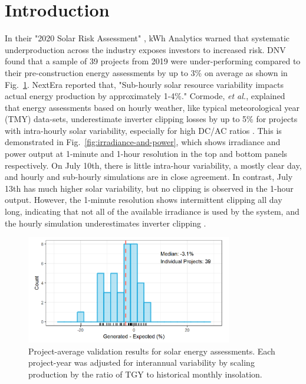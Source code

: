 \documentclass[conference]{IEEEtran}
\begin{document}
\section{Introduction}
In their "2020 Solar Risk Assessment" \cite{Matsui2020}, kWh Analytics warned that systematic underproduction across the industry exposes investors to increased risk. DNV found that a sample of 39 projects from 2019 were under-performing compared to their pre-construction energy assessments by up to 3\% on average as shown in Fig.~\ref{fig:project-underperformance}. NextEra reported that, "Sub-hourly solar resource variability impacts actual energy production by approximately 1-4\%." Cormode, \textit{et al.}, explained that energy assessments based on hourly weather, like typical meteorological year (TMY) data-sets, underestimate inverter clipping losses by up to 5\% for projects with intra-hourly solar variability, especially for high DC/AC ratios \cite{Cormode2019}. This is demonstrated in Fig.~\ref{fig:irradiance-and-power}, which shows irradiance and power output at 1-minute and 1-hour resolution in the top and bottom panels respectively. On July 10th, there is little intra-hour variability, a mostly clear day, and hourly and sub-hourly simulations are in close agreement. In contrast, July 13th has much higher solar variability, but no clipping is observed in the 1-hour output. However, the 1-minute resolution shows intermittent clipping all day long, indicating that not all of the available irradiance is used by the system, and the hourly simulation underestimates inverter clipping \cite{Kharait}.

\begin{figure}[htbp]
\centerline{\includegraphics[width=9cm]{fig1.png}}
\caption{Project-average validation results for solar energy assessments. Each project-year was adjusted for interannual variability by scaling production by the ratio of TGY to historical monthly insolation.}
\label{fig:project-underperformance}
\end{figure}
\end{document}
